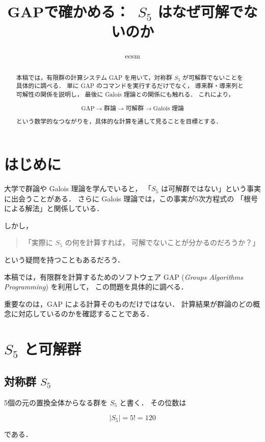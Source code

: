 \documentclass[a4paper,11pt]{jsarticle}
\title{GAPで確かめる：\
$S_5$ はなぜ可解でないのか}
\author{ecsm}
\date{}
\begin{document}
\maketitle

\begin{abstract}
本稿では，有限群の計算システム GAP を用いて，対称群
$S_5$ が可解群でないことを具体的に調べる．
単に GAP のコマンドを実行するだけでなく，
導来群・導来列と可解性の関係を説明し，
最後に Galois 理論との関係にも触れる．
これにより，

$$
\text{GAP}
\longrightarrow
\text{群論}
\longrightarrow
\text{可解群}
\longrightarrow
\text{Galois 理論}
$$

という数学的なつながりを，具体的な計算を通して見ることを目標とする．
\end{abstract}

\section{はじめに}

大学で群論や Galois 理論を学んでいると，
「$S_5$ は可解群ではない」という事実に出会うことがある．
さらに Galois 理論では，この事実が5次方程式の
「根号による解法」と関係している．

しかし，

\begin{quote}
「実際に $S_5$ の何を計算すれば，
可解でないことが分かるのだろうか？」
\end{quote}

という疑問を持つこともあるだろう．

本稿では，有限群を計算するためのソフトウェア
GAP (\textit{Groups Algorithms Programming}) を利用して，
この問題を具体的に調べる．

重要なのは，GAP による計算そのものだけではない．
計算結果が群論のどの概念に対応しているのかを確認することである．

\section{$S_5$ と可解群}

\subsection{対称群 $S_5$}

5個の元の置換全体からなる群を $S_5$ と書く．
その位数は

$$
|S_5|=5!=120
$$

である．
\end{document}
